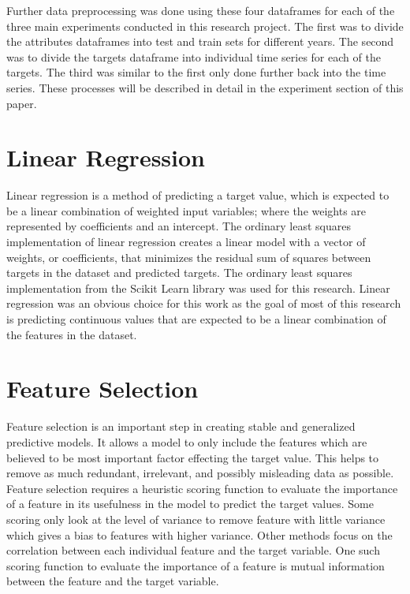 \documentclass[12pt]{dalthesis}
\begin{document}
Further data preprocessing was done using these four dataframes for each of the three main experiments conducted in this research project. The first was to divide the attributes dataframes into test and train sets for different years. The second was to divide the targets dataframe into individual time series for each of the targets. The third was similar to the first only done further back into the time series. These processes will be described in detail in the experiment section of this paper. 

\section{Linear Regression}

Linear regression is a method of predicting a target value, which is expected to be a linear combination of weighted input variables; where the weights are represented by coefficients and an intercept. The ordinary least squares implementation of linear regression creates a linear model with a vector of weights, or coefficients, that minimizes the residual sum of squares between targets in the dataset and predicted targets.\cite{sklearn} The ordinary least squares implementation from the Scikit Learn library was used for this research. Linear regression was an obvious choice for this work as the goal of most of this research is predicting continuous values that are expected to be a linear combination of the features in the dataset.

\section{Feature Selection}

Feature selection is an important step in creating stable and generalized predictive models. It allows a model to only include the features which are believed to be most important factor effecting the target value. This helps to remove as much redundant, irrelevant, and possibly misleading data as possible.\cite{jay}  Feature selection requires a heuristic scoring function to evaluate the importance of a feature in its usefulness in the model to predict the target values. Some scoring only look at the level of variance to remove feature with little variance which gives a bias to features with higher variance. Other methods focus on the correlation between each individual feature and the target variable. One such scoring function to evaluate the importance of a feature is mutual information between the feature and the target variable. \\
\end{document}
